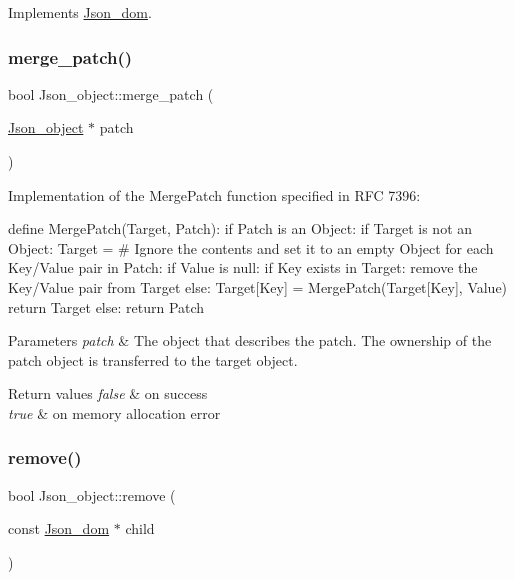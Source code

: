 Implements \mbox{\hyperlink{classJson__dom_aed953eca1e112aade66511ad1bbf82b8}{Json\+\_\+dom}}.

\mbox{\label{classJson__object_a0fc81386771579edb4902c2343df0677}} 
\subsubsection{\texorpdfstring{merge\+\_\+patch()}{merge\_patch()}}
{\footnotesize\ttfamily bool Json\+\_\+object\+::merge\+\_\+patch (\begin{DoxyParamCaption}\item[{\mbox{\hyperlink{classJson__object}{Json\+\_\+object}} $\ast$}]{patch }\end{DoxyParamCaption})}

Implementation of the Merge\+Patch function specified in R\+FC 7396\+: \begin{DoxyVerb}define MergePatch(Target, Patch):
  if Patch is an Object:
    if Target is not an Object:
      Target = {} # Ignore the contents and set it to an empty Object
    for each Key/Value pair in Patch:
      if Value is null:
        if Key exists in Target:
          remove the Key/Value pair from Target
      else:
        Target[Key] = MergePatch(Target[Key], Value)
    return Target
  else:
    return Patch
\end{DoxyVerb}



\begin{DoxyParams}{Parameters}
{\em patch} & The object that describes the patch. The ownership of the patch object is transferred to the target object. \\
\hline
\end{DoxyParams}

\begin{DoxyRetVals}{Return values}
{\em false} & on success \\
\hline
{\em true} & on memory allocation error \\
\hline
\end{DoxyRetVals}
\mbox{\label{classJson__object_af7b096486e0873bc9c023aeed6141310}} 
\subsubsection{\texorpdfstring{remove()}{remove()}\hspace{0.1cm}{\footnotesize\ttfamily [1/2]}}
{\footnotesize\ttfamily bool Json\+\_\+object\+::remove (\begin{DoxyParamCaption}\item[{const \mbox{\hyperlink{classJson__dom}{Json\+\_\+dom}} $\ast$}]{child }\end{DoxyParamCaption})}

